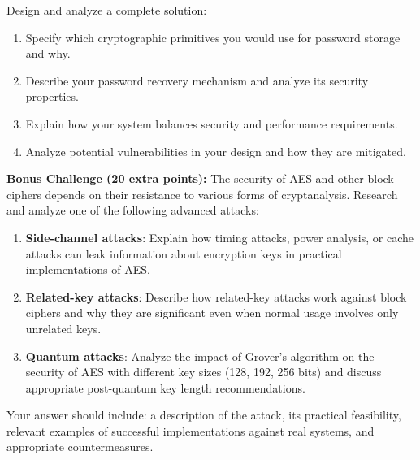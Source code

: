 \documentclass[10pt,a4paper,american]{exam}
\begin{document}
\begin{enumerate}
	      Design and analyze a complete solution:
	      \begin{enumerate}
		      \item Specify which cryptographic primitives you would use for password storage and why.
		      \item Describe your password recovery mechanism and analyze its security properties.
		      \item Explain how your system balances security and performance requirements.
		      \item Analyze potential vulnerabilities in your design and how they are mitigated.
	      \end{enumerate}
\end{enumerate}

\begin{tcolorbox}[colframe=EarthBrown!30!white,colback=EarthBrown!5!white]
	\textbf{Bonus Challenge (20 extra points):} The security of AES and other block ciphers depends on their resistance to various forms of cryptanalysis. Research and analyze one of the following advanced attacks:

	\begin{enumerate}
		\item \textbf{Side-channel attacks}: Explain how timing attacks, power analysis, or cache attacks can leak information about encryption keys in practical implementations of AES.
		\item \textbf{Related-key attacks}: Describe how related-key attacks work against block ciphers and why they are significant even when normal usage involves only unrelated keys.
		\item \textbf{Quantum attacks}: Analyze the impact of Grover's algorithm on the security of AES with different key sizes (128, 192, 256 bits) and discuss appropriate post-quantum key length recommendations.
	\end{enumerate}

	Your answer should include: a description of the attack, its practical feasibility, relevant examples of successful implementations against real systems, and appropriate countermeasures.
\end{tcolorbox}
\end{document}
